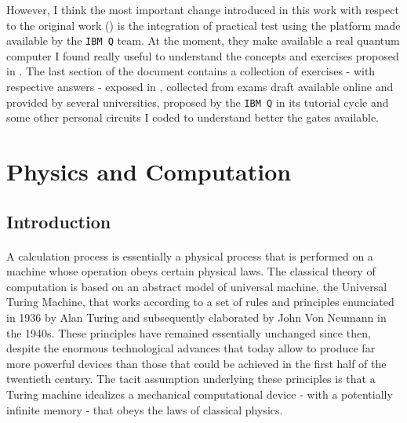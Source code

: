 \documentclass[a4paper,10pt]{article}
\begin{document}
However, I think the most important change introduced in this work with respect to the original work (\cite{dipierro}) is the integration of practical test using the platform made available by the \texttt{IBM Q} team. At the moment, they make available a real quantum computer I found really useful to understand the concepts and exercises proposed in \cite{dipierro}. The last section of the document contains a collection of exercises - with respective answers - exposed in \cite{dipierro}, collected from exams draft available online and provided by several universities, proposed by the \texttt{IBM Q} in its tutorial cycle and some other personal circuits I coded to understand better the gates available.

\newpage

\section{Physics and Computation}

\subsection{Introduction} 

\paragraph{} A calculation process is essentially a physical process that is performed on a machine whose operation obeys certain physical laws. The classical theory of computation is based on an abstract model of universal machine, the Universal Turing Machine, that works according to a set of rules and principles enunciated in 1936 by Alan Turing and subsequently elaborated by John Von Neumann in the 1940s. These principles have remained essentially unchanged since then, despite the enormous technological advances that today allow to produce far more powerful devices than those that could be achieved in the first half of the twentieth century. The tacit assumption underlying these principles is that a Turing machine idealizes a mechanical computational device - with a potentially infinite memory - that obeys the laws of classical physics.
\end{document}
